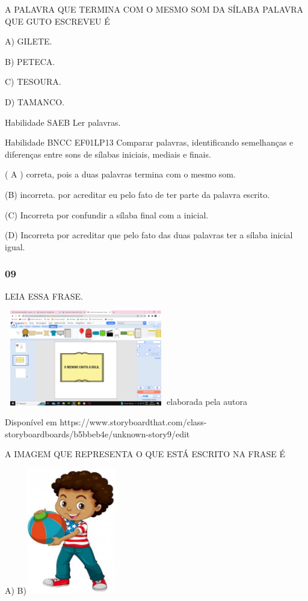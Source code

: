 \begin{escola}
A PALAVRA QUE TERMINA COM O MESMO SOM DA SÍLABA PALAVRA QUE GUTO ESCREVEU
É

A) GILETE.

B) PETECA.

C) TESOURA.

D) TAMANCO.

Habilidade SAEB Ler palavras.

Habilidade BNCC EF01LP13 Comparar palavras, identificando semelhanças e
diferenças entre sons de sílabas iniciais, mediais e finais.

( A ) correta, pois a duas palavras termina com o mesmo som.

(B) incorreta. por acreditar eu pelo fato de ter parte da palavra
escrito.

(C) Incorreta por confundir a sílaba final com a inicial.

(D) Incorreta por acreditar que pelo fato das duas palavras ter a sílaba
inicial igual.

\subsubsection{09}\label{section-34}

LEIA ESSA FRASE.

\includegraphics[width=2.80293in,height=1.64007in]{media/image198.png}elaborada
pela autora

Disponível em
https://www.storyboardthat.com/class-storyboardboards/b5bbeb4e/unknown-story9/edit

A IMAGEM QUE REPRESENTA O QUE ESTÁ ESCRITO NA FRASE É

A)
B)\includegraphics[width=1.53194in,height=2.16250in]{media/image199.jpg}


\end{escola}
